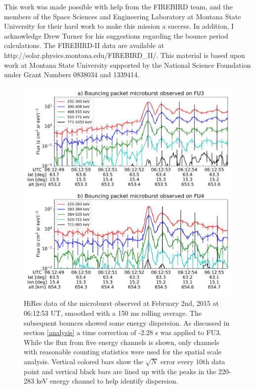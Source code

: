 \documentclass[draft, linenumbers]{agujournal}
\begin{document}
\acknowledgments
This work was made possible with help from the FIREBIRD team, and the members of the Space Sciences and Engineering Laboratory at Montana State University for their hard work to make this mission a success. In addition, I acknowledge Drew Turner for his suggestions regarding the bounce period calculations. The FIREBIRD-II data are available at http://solar.physics.montana.edu/FIREBIRD\_II/. This material is based upon work at Montana State University supported by the National Science Foundation under Grant Numbers 0838034 and 1339414.

\begin{figure}
\includegraphics[width=\textwidth]{hires_plot_log_8pt_smooth_pos_v2.pdf}
\caption{HiRes data of the microburst observed at February 2nd, 2015 at 06:12:53 UT, smoothed with a 150 ms rolling average. The subsequent bounces showed some energy dispersion. As discussed in section \ref{analysis} a time correction of -2.28 s was applied to FU3. While the flux from five energy channels is shown, only channels with reasonable counting statistics were used for the spatial scale analysis. Vertical colored bars show the $\sqrt{N}$ error every 10th data point and vertical black bars are lined up with the peaks in the 220-283 keV energy channel to help identify dispersion.}
\label{hires_plot}
\end{figure}
\end{document}
